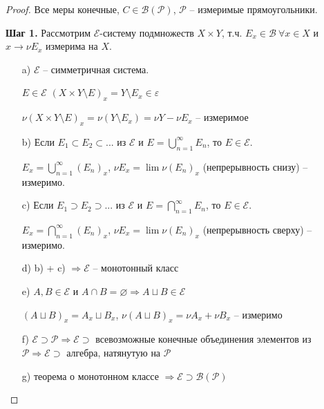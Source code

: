 \begin{proof}
    Все меры конечные, $C\in \mathcal{B}(\mathcal{P})$, $\mathcal{P}$ – измеримые прямоугольники.

    \textbf{Шаг 1.} Рассмотрим $\mathcal{E}$-систему подмножеств $X\times Y$, т.ч. $E_x\in \mathcal{B}
    \ \forall x\in X$ и $x\rightarrow \nu E_x$ измерима на $X$.

    \begin{enumerate}
        \item[a)] $\mathcal{E}$ – симметричная система. 
        
        $E\in \mathcal{E}$ $(X\times Y\setminus E)_x = Y \setminus E_x \in \varepsilon$

        $\nu (X\times Y \setminus E)_x = \nu (Y\setminus E_x) = \nu Y - \nu E_x$ – измеримое

        \item[b)] Если $E_1\subset E_2 \subset ...$ из $\mathcal{E}$ и $E=\bigcup\limits_{n=1}^\infty E_n$, то $E\in \mathcal{E}$.
        
        $E_x=\bigcup\limits_{n=1}^\infty (E_n)_x$, $\nu E_x =\lim \nu (E_n)_x$ (непрерывность снизу) – измеримо.

        \item[c)] Если $E_1\supset E_2 \supset ...$ из $\mathcal{E}$ и $E=\bigcap\limits_{n=1}^\infty E_n$, то $E\in \mathcal{E}$.
        
        $E_x=\bigcap\limits_{n=1}^\infty (E_n)_x$, $\nu E_x =\lim \nu (E_n)_x$ (непрерывность сверху) – измеримо.
        
        \item[d)] b) + c) $\Rightarrow\mathcal{E}$ – монотонный класс
        
        \item[e)] $A, B\in \mathcal{E}$ и $A\cap B=\varnothing\Rightarrow A\sqcup B \in \mathcal{E}$
        
        $(A\sqcup B)_x = A_x\sqcup B_x$, $\nu (A\sqcup B)_x = \nu A_x + \nu B_x$ – измеримо
        
        \item[f)] $\mathcal{E}\supset \mathcal{P}\Rightarrow \mathcal{E}\supset$ всевозможные конечные объединения элементов из $\mathcal{P}
        \Rightarrow \mathcal{E} \supset$ алгебра, натянутую на $\mathcal{P}$

        \item[g)] теорема о монотонном классе $\Rightarrow \mathcal{E} \supset \mathcal{B}(\mathcal{P})$
    \end{enumerate}


\end{proof}
